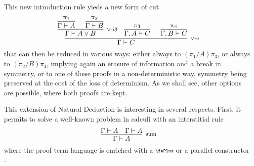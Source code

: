 \documentclass[screen, sigconf,authorversion,nonacm]{acmart}
\theoremstyle{acmdefinition}
\numberwithin{equation}{section}
\newcommand\irule[3]{\infer[\mbox{\footnotesize $#3$}]{#2}{#1}}
\newcommand\plus{\mathrel{\text{\normalfont\scalebox{0.7}{\faPlus}}}}
\begin{document}
This new introduction rule yieds a new form of cut
$$\irule{\irule{\irule{\pi_1}
                      {\Gamma \vdash A}
                      {}
                &
                \irule{\pi_2}
                      {\Gamma \vdash B}
                      {}
                }
                {\Gamma \vdash A \vee B}
                {\mbox{$\vee$-i3}}
          &
          \irule{\pi_3}
                {\Gamma, A\vdash C}
                {}
          &
          \irule{\pi_4}
                {\Gamma, B\vdash C}
                {}
         }
         {\Gamma \vdash C}
         {\mbox{$\vee$-e}}$$
that can then be reduced in various ways: either always to
$(\pi_1/A)\pi_3$, or always to $(\pi_2/B)\pi_4$, implying again an
erasure of information and a break in symmetry, or to one of these
proofs in a non-deterministic way, symmetry being preserved at the
cost of the loss of determinism. As we shall see, other options are
possible, where both proofs are kept.

This extension of Natural Deduction is interesting in several
respects.  First, it permits to solve a well-known problem in calculi
with an interstitial rule
$$\irule{\Gamma \vdash A &\Gamma \vdash A}
        {\Gamma \vdash A}
        {\mbox{sum}}$$
where the proof-term language is enriched with a $\plus$ or a parallel
constructor
\cite{DiazcaroDowekMSCS24,ArrighiDiazcaroLMCS12,Vaux2009,LairdManzonettoMcCuskerPaganiLICS13}.
        
\end{document}
